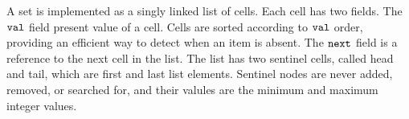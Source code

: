 A set is implemented as a singly linked list of cells. Each cell has two fields. The $\tt val$ field present value of a cell. Cells are sorted according to $\tt val$ order, providing an efficient way to detect when an item is absent. The $\tt next$ field is a reference to
the next cell in the list. The list has two sentinel cells, called head and tail, which are first and last list elements. Sentinel nodes are never added, removed, or searched for, and their valules are the minimum and maximum integer values.
 
